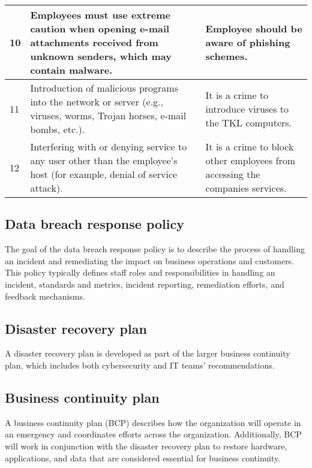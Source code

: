 \documentclass{article}
\begin{document}
\begin{center}
\begin{longtable}{|p{1cm}|p{5cm}|p{5cm}|}
        10
         &
        Employees must use extreme caution when opening e-mail attachments received from
        unknown senders, which may contain malware.
         &
        Employee should be aware of phishing schemes.                                                                                                                                                         \\
        \hline

        11
         &
        Introduction of malicious programs into the network or server (e.g., viruses, worms,
        Trojan horses, e-mail bombs, etc.).
         &
        It is a crime to introduce viruses to the TKL computers.                                                                                                                                              \\
        \hline

        12
         &
        Interfering with or denying service to any user other than the employee's host (for
        example, denial of service attack).
         &
        It is a crime to block other employees from accessing the companies services.                                                                                                                         \\
        \hline
    \end{longtable}
\end{center}

\subsection*{Data breach response policy}
The goal of the data breach response policy is to describe the process of handling an incident and remediating the impact on business operations and customers. This policy typically defines staff roles and responsibilities in handling an incident, standards and metrics, incident reporting, remediation efforts, and feedback mechanisms. \citep{dbrp}

\subsection*{Disaster recovery plan}
A disaster recovery plan is developed as part of the larger business continuity plan, which includes both cybersecurity and IT teams’ recommendations. \citep{drpp}

\subsection*{Business continuity plan}
A business continuity plan (BCP) describes how the organization will operate in an emergency and coordinates efforts across the organization. Additionally, BCP will work in conjunction with the disaster recovery plan to restore hardware, applications, and data that are considered essential for business continuity.
\end{document}
